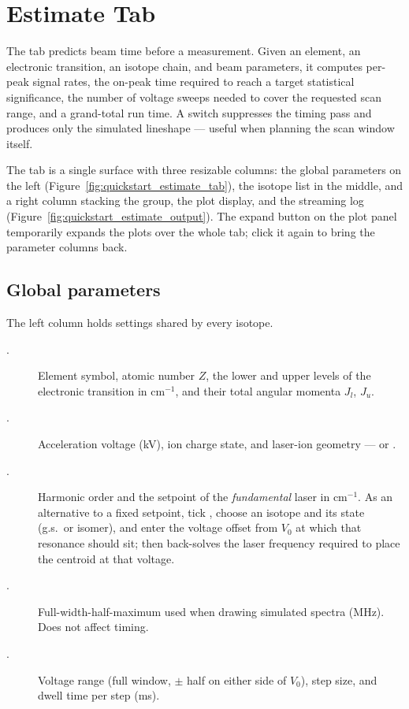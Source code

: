 \section{Estimate Tab}
\label{sec:estimate}

The  tab predicts beam time before a measurement. Given
an element, an electronic transition, an isotope chain, and beam
parameters, it computes per-peak signal rates, the on-peak time
required to reach a target statistical significance, the number of
voltage sweeps needed to cover the requested scan range, and a
grand-total run time. A  switch suppresses the
timing pass and produces only the simulated lineshape --- useful when
planning the scan window itself.

The tab is a single surface with three resizable columns: the global
parameters on the left (Figure~\ref{fig:quickstart_estimate_tab}), the
isotope list in the middle, and a right column stacking the
 group, the plot display, and the streaming log
(Figure~\ref{fig:quickstart_estimate_output}). The expand button on
the plot panel temporarily expands the plots over the whole tab;
click it again to bring the parameter columns back.

\subsection{Global parameters}

The left column holds settings shared by every isotope.

\begin{description}
    \item[.]
        Element symbol, atomic number $Z$, the lower and upper levels
        of the electronic transition in cm$^{-1}$, and their total
        angular momenta $J_l$, $J_u$.
    \item[.]
        Acceleration voltage (kV), ion charge state, and laser-ion
        geometry ---  or .
    \item[.]
        Harmonic order and the setpoint of the \emph{fundamental}
        laser in cm$^{-1}$. As an alternative to a fixed setpoint,
        tick , choose an isotope and its state
        (g.s.\ or isomer), and enter the voltage offset  from
        $V_0$ at which that resonance should sit; \denis{} then
        back-solves the laser frequency required to place the
        centroid at that voltage.
    \item[.]
        Full-width-half-maximum used when drawing simulated spectra
        (MHz). Does not affect timing.
    \item[.]
        Voltage range (full window, $\pm$ half on either side of
        $V_0$), step size, and dwell time per step (ms).
\end{description}


